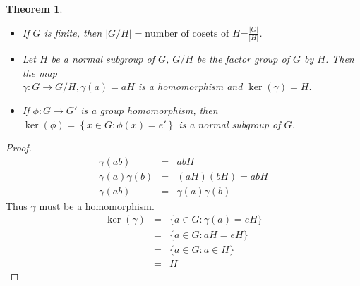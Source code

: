 \documentclass{article}
\theoremstyle{MyNonumberplain}
\theoremstyle{break}
\newtheorem*{proof}{Proof. }
\newcommand{\p}{\phi}
\theoremstyle{break}
\newtheorem{theorem}{Theorem}[section]
\theoremstyle{break}
\theoremstyle{definition}
\theoremstyle{break}
\begin{document}
\begin{thmbox}
    \begin{theorem}
        \begin{itemize}
            \item If $G$ is finite, then $| G / H | = \text{number of cosets of $H$=}
            \frac{| G |}{| H |}$.\\
            
            \item Let $H$ be a normal subgroup of $G$, $G / H$ be the factor group of
            $G$ by $H$. Then the map\\
            
            $\gamma : G \rightarrow G / H, \gamma (a) = a H$ is a homomorphism and $\ker
            (\gamma) = H$.\\
            
            \item If $\p : G \rightarrow G'$ is a group homomorphism, then $\ker \left(
            \p \right) = \left\{ x \in G : \p (x) = e' \right\}$ is a normal subgroup of
            $G$.
          \end{itemize}
    \end{theorem}
    \begin{prfbox}
        \begin{proof}
            \begin{eqnarray*}
                \gamma (a b) & = & a b H\\
                \gamma (a) \gamma (b) & = & (a H) (b H) = a b H\\
                \gamma (a b) & = & \gamma (a) \gamma (b)
              \end{eqnarray*}
              Thus $\gamma$ must be a homomorphism.
              \begin{eqnarray*}
                \ker (\gamma) & = & \{ a \in G : \gamma (a) = e H \}\\
                & = & \{ a \in G : a H = e H \}\\
                & = & \{ a \in G : a \in H \}\\
                & = & H
              \end{eqnarray*}
        \end{proof}
    \end{prfbox}
\end{thmbox}
\end{document}
